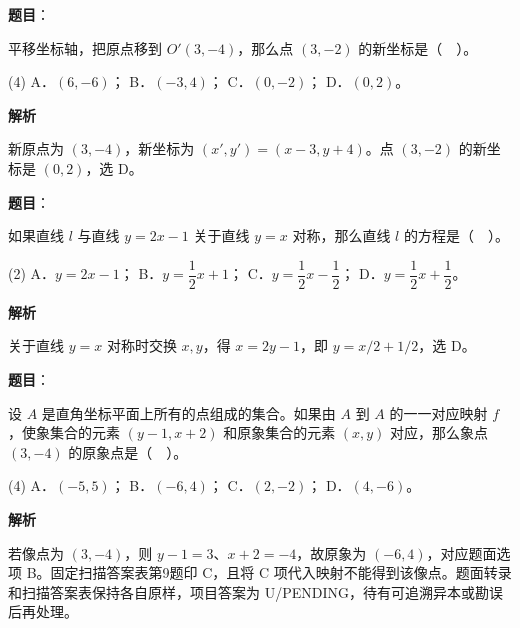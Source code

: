 \begin{answer}

\textbf{题目}：

平移坐标轴，把原点移到 $O'(3,-4)$，那么点 $(3,-2)$ 的新坐标是（　）。

\begin{gkopts}(4)
\task A．$(6,-6)$；
\task B．$(-3,4)$；
\task C．$(0,-2)$；
\task D．$(0,2)$。
\end{gkopts}

\textbf{解析}

新原点为 $(3,-4)$，新坐标为 $(x',y')=(x-3,y+4)$。点 $(3,-2)$ 的新坐标是 $(0,2)$，选 D。


\end{answer}
\begin{answer}

\textbf{题目}：

如果直线 $l$ 与直线 $y=2x-1$ 关于直线 $y=x$ 对称，那么直线 $l$ 的方程是（　）。

\begin{gkopts}(2)
\task A．$y=2x-1$；
\task B．$y=\dfrac12x+1$；
\task C．$y=\dfrac12x-\dfrac12$；
\task D．$y=\dfrac12x+\dfrac12$。
\end{gkopts}

\textbf{解析}

关于直线 $y=x$ 对称时交换 $x,y$，得 $x=2y-1$，即 $y=x/2+1/2$，选 D。


\end{answer}
\begin{answer}

\textbf{题目}：

设 $A$ 是直角坐标平面上所有的点组成的集合。如果由 $A$ 到 $A$ 的一一对应映射 $f$，使象集合的元素 $(y-1,x+2)$ 和原象集合的元素 $(x,y)$ 对应，那么象点 $(3,-4)$ 的原象点是（　）。

\begin{gkopts}(4)
\task A．$(-5,5)$；
\task B．$(-6,4)$；
\task C．$(2,-2)$；
\task D．$(4,-6)$。
\end{gkopts}

\textbf{解析}

若像点为 $(3,-4)$，则 $y-1=3$、$x+2=-4$，故原象为 $(-6,4)$，对应题面选项 B。固定扫描答案表第9题印 C，且将 C 项代入映射不能得到该像点。题面转录和扫描答案表保持各自原样，项目答案为 U/PENDING，待有可追溯异本或勘误后再处理。


\end{answer}
